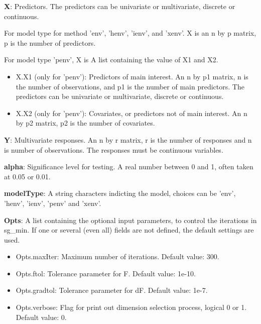 \documentclass[a4paper,11pt,openany]{memoir}
\begin{document}
\begin{par}
\textbf{X}: Predictors.   The predictors can be univariate or multivariate, discrete or continuous.
\end{par} \vspace{1em}
\begin{par}
For model type for method 'env', 'henv', 'ienv', and 'xenv'. X is an n by p matrix, p is the number of predictors.
\end{par} \vspace{1em}
\begin{par}
For model type 'penv', X is  A list containing the value of X1 and X2.
\end{par} \vspace{1em}
\begin{itemize}
\setlength{\itemsep}{-1ex}
   \item X.X1 (only for 'penv'): Predictors of main interest. An n by p1 matrix, n is the number of observations, and p1 is the number of main predictors. The predictors can be univariate or multivariate, discrete or continuous.
   \item X.X2 (only for 'penv'): Covariates, or predictors not of main interest.  An n by p2 matrix, p2 is the number of covariates.
\end{itemize}
\begin{par}
\textbf{Y}: Multivariate responses. An n by r matrix, r is the number of responses and n is number of observations. The responses must be continuous variables.
\end{par} \vspace{1em}
\begin{par}
\textbf{alpha}: Significance level for testing.  A real number between 0 and 1, often taken at 0.05 or 0.01.
\end{par} \vspace{1em}
\begin{par}
\textbf{modelType}: A string characters indicting the model, choices can be 'env', 'henv', 'ienv', 'penv' and 'xenv'.
\end{par} \vspace{1em}
\begin{par}
\textbf{Opts}: A list containing the optional input parameters, to control the iterations in sg\_min. If one or several (even all) fields are not defined, the default settings are used.
\end{par} \vspace{1em}
\begin{itemize}
\setlength{\itemsep}{-1ex}
   \item Opts.maxIter: Maximum number of iterations.  Default value: 300.
   \item Opts.ftol: Tolerance parameter for F.  Default value: 1e-10.
   \item Opts.gradtol: Tolerance parameter for dF.  Default value: 1e-7.
   \item Opts.verbose: Flag for print out dimension selection process, logical 0 or 1. Default value: 0.
\end{itemize}
\end{document}
